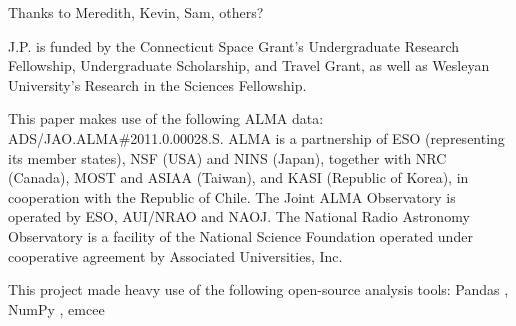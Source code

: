 \bigskip
\bigskip
\bigskip


Thanks to Meredith, Kevin, Sam, others?

J.P. is funded by the Connecticut Space Grant's Undergraduate Research Fellowship, Undergraduate Scholarship, and Travel Grant, as well as Wesleyan University’s Research in the Sciences Fellowship.

This paper makes use of the following ALMA data: ADS/JAO.ALMA\#2011.0.00028.S. ALMA is a partnership of ESO (representing its member states), NSF (USA) and NINS (Japan), together with NRC (Canada), MOST and ASIAA (Taiwan), and KASI (Republic of Korea), in cooperation with the Republic of Chile. The Joint ALMA Observatory is operated by ESO, AUI/NRAO and NAOJ. The National Radio Astronomy Observatory is a facility of the National Science Foundation operated under cooperative agreement by Associated Universities, Inc.


This project made heavy use of the following open-source analysis tools: Pandas \citep{McKinney2010,McKinney2011}, NumPy \citep{VanDerWalt2011}, emcee \citep{ForemanMackey2013}
